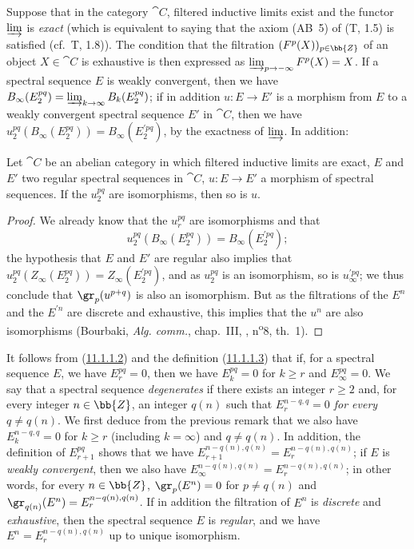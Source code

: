 \begin{env}[11.1.4]
\label{0.11.1.4}
Suppose that in the category $\cat{C}$, filtered inductive limits exist and the functor $\varinjlim$ is \emph{exact} (which is equivalent to saying that the axiom (AB~5) of (T, 1.5) is satisfied (cf.~T, 1.8)).
The condition that the filtration $(F^p(X))_{p\in\bb{Z}}$ of an object $X\in\cat{C}$ is exhaustive is then expressed as $\varinjlim_{p\to-\infty}F^p(X)=X$.
If a spectral sequence $E$ is weakly convergent, then we have $B_\infty(E_2^{pq})=\varinjlim_{k\to\infty}B_k(E_2^{pq})$; if in addition $u:E\to E'$ is a morphism from $E$ to a weakly convergent spectral sequence $E'$ in $\cat{C}$, then we have $u_2^{pq}(B_\infty(E_2^{pq}))=B_\infty(E_2^{\prime pq})$, by the exactness of $\varinjlim$.
In addition:
\end{env}

\begin{proposition}[11.1.5]
\label{0.11.1.5}
Let $\cat{C}$ be an abelian category in which filtered inductive limits are exact, $E$ and $E'$ two regular spectral sequences in $\cat{C}$, $u:E\to E'$ a morphism of spectral sequences.
If the $u_2^{pq}$ are isomorphisms, then so is $u$.
\end{proposition}

\begin{proof}
We already know  that the $u_r^{pq}$ are isomorphisms and that
\[
  u_2^{pq}(B_\infty(E_2^{pq}))=B_\infty(E_2^{\prime pq});
\]
the hypothesis that $E$ and $E'$ are regular also implies that $u_2^{pq}(Z_\infty(E_2^{pq}))=Z_\infty(E_2^{\prime pq})$, and as $u_2^{pq}$ is an isomorphism, so is $u_\infty^{\prime pq}$; we thus conclude that $\gr_p(u^{p+q})$ is also an isomorphism.
But as the filtrations of the $E^n$ and the $E^{\prime n}$ are discrete and exhaustive, this implies that the $u^n$ are also isomorphisms (Bourbaki, \emph{Alg. comm.}, chap.~III, , n\textsuperscript{o}8, th.~1).
\end{proof}

\begin{env}[11.1.6]
\label{0.11.1.6}
It follows from (\hyperref[0.11.1.1.2]{11.1.1.2}) and the definition (\hyperref[0.11.1.1.3]{11.1.1.3}) that if, for a spectral sequence $E$, we have $E_r^{pq}=0$, then we have $E_k^{pq}=0$ for $k\geq r$ and $E_\infty^{pq}=0$.
We say that a spectral sequence \emph{degenerates} if there exists an integer $r\geq 2$ and, for every integer $n\in\bb{Z}$, an integer $q(n)$ such that \emph{$E_r^{n-q,q}=0$ for every $q\neq q(n)$}.
We first deduce from the previous remark that we also have $E_k^{n-q,q}=0$ for $k\geq r$ (including $k=\infty$) and $q\neq q(n)$.
In addition, the definition of $E_{r+1}^{pq}$ shows that we have $E_{r+1}^{n-q(n),q(n)}=E_r^{n-q(n),q(n)}$; if $E$ is \emph{weakly convergent}, then we also have $E_\infty^{n-q(n),q(n)}=E_r^{n-q(n),q(n)}$; in other words, for every $n\in\bb{Z}$, $\gr_p(E^n)=0$ for $p\neq q(n)$ and $\gr_{q(n)}(E^n)=E_r^{n-q(n),q(n)}$.
If in addition the filtration of $E^n$ is \emph{discrete} and \emph{exhaustive}, then the spectral sequence $E$ is \emph{regular}, and we have $E^n=E_r^{n-q(n),q(n)}$ up to unique isomorphism.
\end{env}

